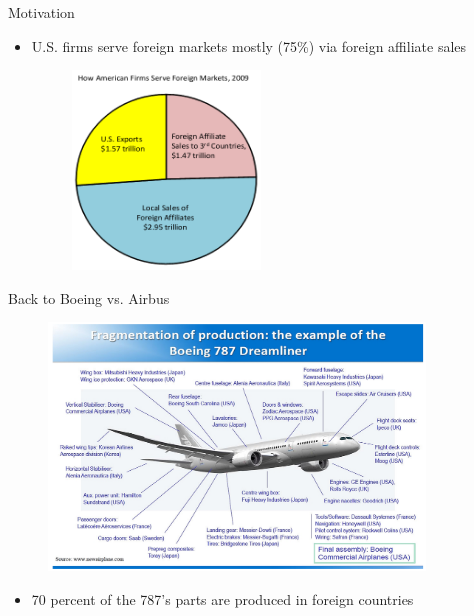 \documentclass[10pt,hyperref={CJKbookmarks=true},xcolor=dvipsnames,aspectratio=169]{beamer}
\begin{document}
\begin{frame}{Motivation }

\begin{itemize}
\item U.S. firms serve foreign markets mostly (75\%) via foreign affiliate
sales 
\begin{figure}


\begin{centering}
\includegraphics[width=5cm]{fig/fdi/lec7-2}
\par\end{centering}

\end{figure}

\end{itemize}
\end{frame}

\begin{frame}{Back to Boeing vs. Airbus }


\begin{figure}


\begin{centering}
\includegraphics[width=10cm]{fig/fdi/glo12}
\par\end{centering}

\end{figure}

\begin{itemize}
\item 70 percent of the 787’s parts are produced in foreign countries 
\end{itemize}
\end{frame}
\end{document}
